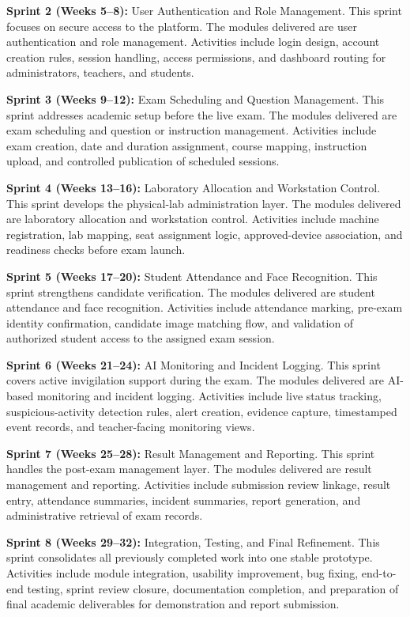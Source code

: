 \textbf{Sprint 2 (Weeks 5--8):} User Authentication and Role Management. This sprint focuses on secure access to the platform. The modules delivered are user authentication and role management. Activities include login design, account creation rules, session handling, access permissions, and dashboard routing for administrators, teachers, and students.

\textbf{Sprint 3 (Weeks 9--12):} Exam Scheduling and Question Management. This sprint addresses academic setup before the live exam. The modules delivered are exam scheduling and question or instruction management. Activities include exam creation, date and duration assignment, course mapping, instruction upload, and controlled publication of scheduled sessions.

\textbf{Sprint 4 (Weeks 13--16):} Laboratory Allocation and Workstation Control. This sprint develops the physical-lab administration layer. The modules delivered are laboratory allocation and workstation control. Activities include machine registration, lab mapping, seat assignment logic, approved-device association, and readiness checks before exam launch.

\textbf{Sprint 5 (Weeks 17--20):} Student Attendance and Face Recognition. This sprint strengthens candidate verification. The modules delivered are student attendance and face recognition. Activities include attendance marking, pre-exam identity confirmation, candidate image matching flow, and validation of authorized student access to the assigned exam session.

\textbf{Sprint 6 (Weeks 21--24):} AI Monitoring and Incident Logging. This sprint covers active invigilation support during the exam. The modules delivered are AI-based monitoring and incident logging. Activities include live status tracking, suspicious-activity detection rules, alert creation, evidence capture, timestamped event records, and teacher-facing monitoring views.

\textbf{Sprint 7 (Weeks 25--28):} Result Management and Reporting. This sprint handles the post-exam management layer. The modules delivered are result management and reporting. Activities include submission review linkage, result entry, attendance summaries, incident summaries, report generation, and administrative retrieval of exam records.

\textbf{Sprint 8 (Weeks 29--32):} Integration, Testing, and Final Refinement. This sprint consolidates all previously completed work into one stable prototype. Activities include module integration, usability improvement, bug fixing, end-to-end testing, sprint review closure, documentation completion, and preparation of final academic deliverables for demonstration and report submission.
